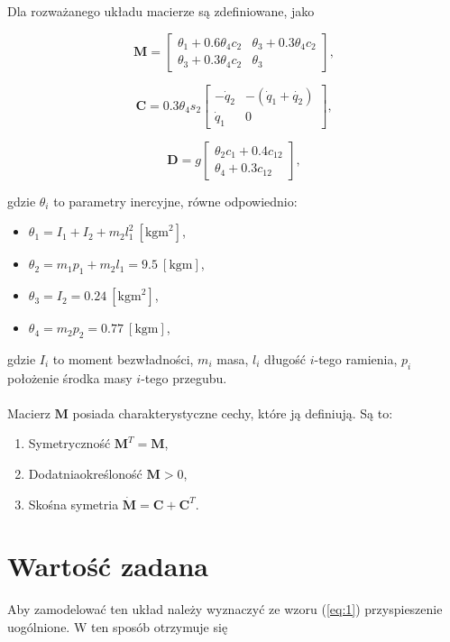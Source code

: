 \documentclass[12pt,a4paper]{article}
\begin{document}
Dla rozważanego układu macierze są zdefiniowane, jako

$$\mathbf{M} = \begin{bmatrix}
\theta_1 + 0.6\theta_4c_2 & \theta_3+0.3\theta_4c_2\\
\theta_3+0.3\theta_4c_2 & \theta_3
\end{bmatrix},$$

$$\mathbf{C} = 0.3\theta_4s_2\begin{bmatrix}
-\dot{q}_2 &-(\dot{q}_1 + \dot{q_2})\\
\dot{q}_1 & 0
\end{bmatrix},$$

$$\mathbf{D} = g\begin{bmatrix}
\theta_2c_1 + 0.4c_{12}\\
\theta_4+0.3c_{12}
\end{bmatrix},$$

gdzie $\theta_i$ to parametry inercyjne, równe odpowiednio:

\begin{itemize}
    \item $\theta_1 = I_1 + I_2 + m_2l_1^2~[\text{kgm}^2]$,
    \item $\theta_2 = m_1p_1 + m_2l_1=9.5~[\text{kgm}]$,
    \item $\theta_3 = I_2 = 0.24~[\text{kgm}^2]$,
    \item $\theta_4 = m_2p_2 = 0.77~[\text{kgm}]$,
\end{itemize}

gdzie $I_i$ to moment bezwładności, $m_i$ masa, $l_i$ długość $i$-tego ramienia, $p_i$ położenie środka masy $i$-tego przegubu.\\
\\
Macierz $\mathbf{M}$ posiada charakterystyczne cechy, które ją definiują. Są to:

\begin{enumerate}
    \item Symetryczność $\mathbf{M}^T = \mathbf{M}$,
    \item Dodatniaokreśloność $\mathbf{M} > 0$,
    \item Skośna symetria $\dot{\mathbf{M}} = \mathbf{C} + \mathbf{C}^T.$
\end{enumerate}

\section{Wartość zadana}

Aby zamodelować ten układ należy wyznaczyć ze wzoru (\ref{eq:1}) przyspieszenie uogólnione. W ten sposób otrzymuje się
\end{document}
